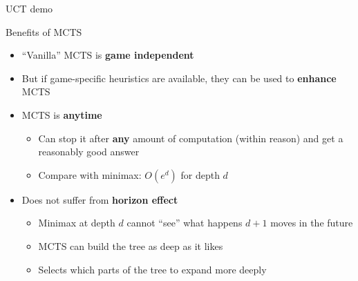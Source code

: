 \begin{frame}{UCT demo}
\end{frame}

\begin{frame}{Benefits of MCTS}
	\begin{itemize}
		\pause\item ``Vanilla'' MCTS is \textbf{game independent}
		\pause\item But if game-specific heuristics are available, they can be used to \textbf{enhance} MCTS
		\pause\item MCTS is \textbf{anytime}
			\begin{itemize}
				\pause\item Can stop it after \textbf{any} amount of computation (within reason) and get a reasonably good answer
				\pause\item Compare with minimax: $O(e^d)$ for depth $d$
			\end{itemize}
		\pause\item Does not suffer from \textbf{horizon effect}
			\begin{itemize}
				\pause\item Minimax at depth $d$ cannot ``see'' what happens $d+1$ moves in the future
				\pause\item MCTS can build the tree as deep as it likes
				\pause\item Selects which parts of the tree to expand more deeply
			\end{itemize}
	\end{itemize}
\end{frame}

